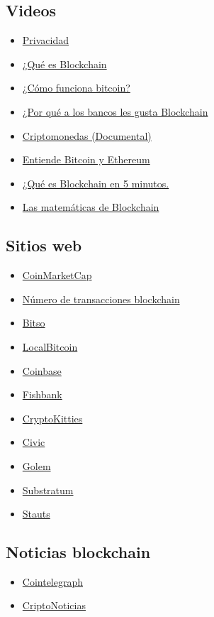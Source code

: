 \documentclass[a4paper,12pt]{lib/pub}
\begin{document}
\subsection{Videos}
\begin{itemize}
	\item \href{https://www.youtube.com/watch?v=RSj9QQMPMWg}{Privacidad}
	\item \href{https://www.youtube.com/watch?v=E2QT9RHmNsY}{¿Qué es Blockchain}	
	\item \href{https://www.youtube.com/watch?v=t5JGQXCTe3c}{¿Cómo funciona bitcoin?}
	\item \href{https://www.youtube.com/watch?v=DAjtCmA-vxE\&feature=youtu.be}{¿Por qué a los bancos les gusta Blockchain}
	\item \href{https://www.youtube.com/watch?v=S00MWI3YeP4\&pbjreload=10}{Criptomonedas (Documental)}
	\item \href{https://www.youtube.com/watch?v=YBNr69vrscw\&list=PLgo3Qtdm2bOMKyzFGy-B3MiDAGPIeqbKP}{Entiende Bitcoin y Ethereum}
	\item \href{https://www.youtube.com/watch?v=Yn8WGaO\_\_ak\&list=PLgo3Qtdm2bOMKyzFGy-B3MiDAGPIeqbKP\&index=2}{¿Qué es Blockchain en 5 minutos.}
	\item \href{https://www.youtube.com/watch?v=b5dhq3dSG2k}{Las matemáticas de Blockchain}
\end{itemize}

\subsection{Sitios web}
\begin{itemize}
	\item \href{https://coinmarketcap.com/}{CoinMarketCap}
	\item \href{https://www.blockchain.com/charts/n-transactions?timespan=all}{Número de transacciones blockchain}
	\item \href{https://bitso.com/}{Bitso}
	\item \href{https://localbitcoins.com/}{LocalBitcoin}
	\item \href{https://www.coinbase.com/}{Coinbase}
	\item \href{https://fishbank.io/n/?r=1}{Fishbank}
	\item \href{https://www.cryptokitties.co/}{CryptoKitties}
	\item \href{https://www.civic.com/}{Civic}
	\item \href{https://golem.network/}{Golem}
	\item \href{https://substratum.net/}{Substratum}
	\item \href{https://status.im/}{Stauts}
\end{itemize}
\subsection{Noticias blockchain}
\begin{itemize}
	\item \href{https://es.cointelegraph.com/}{Cointelegraph}
	\item \href{https://www.criptonoticias.com/}{CriptoNoticias}
\end{itemize}
\end{document}
